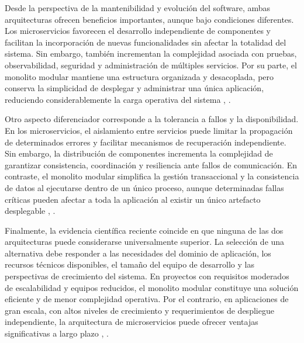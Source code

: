 \documentclass[10pt,conference]{IEEEtran}
\begin{document}
Desde la perspectiva de la mantenibilidad y evolución del software, ambas arquitecturas ofrecen beneficios importantes, aunque bajo condiciones diferentes. Los microservicios favorecen el desarrollo independiente de componentes y facilitan la incorporación de nuevas funcionalidades sin afectar la totalidad del sistema. Sin embargo, también incrementan la complejidad asociada con pruebas, observabilidad, seguridad y administración de múltiples servicios. Por su parte, el monolito modular mantiene una estructura organizada y desacoplada, pero conserva la simplicidad de desplegar y administrar una única aplicación, reduciendo considerablemente la carga operativa del sistema \cite{ref11}, \cite{ref19}.

Otro aspecto diferenciador corresponde a la tolerancia a fallos y la disponibilidad. En los microservicios, el aislamiento entre servicios puede limitar la propagación de determinados errores y facilitar mecanismos de recuperación independiente. Sin embargo, la distribución de componentes incrementa la complejidad de garantizar consistencia, coordinación y resiliencia ante fallos de comunicación. En contraste, el monolito modular simplifica la gestión transaccional y la consistencia de datos al ejecutarse dentro de un único proceso, aunque determinadas fallas críticas pueden afectar a toda la aplicación al existir un único artefacto desplegable \cite{ref1}, \cite{ref2}.

Finalmente, la evidencia científica reciente coincide en que ninguna de las dos arquitecturas puede considerarse universalmente superior. La selección de una alternativa debe responder a las necesidades del dominio de aplicación, los recursos técnicos disponibles, el tamaño del equipo de desarrollo y las perspectivas de crecimiento del sistema. En proyectos con requisitos moderados de escalabilidad y equipos reducidos, el monolito modular constituye una solución eficiente y de menor complejidad operativa. Por el contrario, en aplicaciones de gran escala, con altos niveles de crecimiento y requerimientos de despliegue independiente, la arquitectura de microservicios puede ofrecer ventajas significativas a largo plazo \cite{ref9}, \cite{ref19}.
\end{document}
